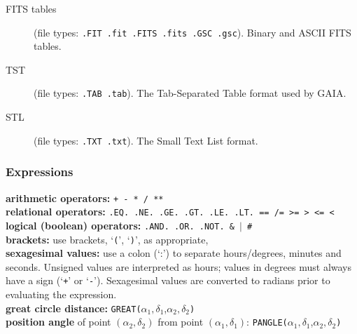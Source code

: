 \documentclass[twoside,11pt]{article}
\renewcommand{\_}{\texttt{\symbol{95}}}
\begin{document}
\begin{description}

  \item[FITS tables] (file types: {\tt .FIT .fit .FITS .fits .GSC .gsc}).
   Binary and ASCII FITS tables.

  \item[TST] (file types: {\tt .TAB .tab}).
   The Tab-Separated Table format used by GAIA.

  \item[STL] (file types: {\tt .TXT .txt}).
   The Small Text List format.




\end{description}

\subsubsection*{Expressions}

{\bf arithmetic operators:} {\tt + - * / **}  \\
{\bf relational operators:}  {\tt .EQ. .NE. .GE. .GT. .LE.
   .LT. == /= >= > <= <}  \\
{\bf logical (boolean) operators:} {\tt .AND. .OR. .NOT. \& $|$ \# }  \\
{\bf brackets:} use brackets, `{\tt (}', `{\tt )}', as appropriate,  \\
{\bf sexagesimal values:} use a colon (`:') to separate 
   hours/degrees, minutes and seconds. Unsigned values are interpreted
   as hours; values in degrees must always have a sign (`{\tt +}' or
   `{\tt -}'). Sexagesimal values are converted to radians prior to
   evaluating the expression.  \\
{\bf great circle distance:} 
   {\tt GREAT(}$\alpha_{1},\delta_{1}$,$\alpha_{2},\delta_{2}${\tt )} \\
{\bf  position angle} of point $(\alpha_{2},\delta_{2})$ from point 
  $(\alpha_{1},\delta_{1})$:
  {\tt PANGLE(}$\alpha_{1},\delta_{1}$,$\alpha_{2},\delta_{2}${\tt )}
\newpage
\end{document}
